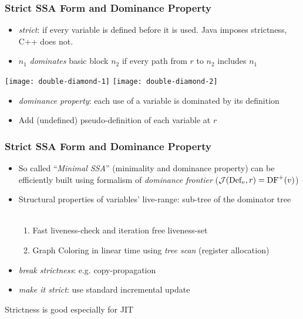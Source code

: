 \begin{frame}
\frametitle{Strict SSA Form and Dominance Property}
\begin{itemize}
\item \emph{strict}: if every variable is defined before it is used. Java imposes strictness, C++ does not.
\item $n_1$ \emph{dominates} basic block $n_2$ if every path
from $r$ to $n_2$ includes $n_1$
\end{itemize}
\begin{minipage}[t]{0.5\textwidth}
\texttt{[image: double-diamond-1]}\hfill
\texttt{[image: double-diamond-2]}
\end{minipage}
\begin{minipage}[t]{0.45\textwidth}
\begin{itemize}
\item \emph{dominance property}: each use of a variable is dominated
by its definition
\item Add (undefined) pseudo-definition of each variable at $r$
\end{itemize}
\hspace{1cm}
\end{minipage}
\end{frame}

\begin{frame}
\frametitle{Strict SSA Form and Dominance Property}
\begin{itemize}
\item So called ``\emph{Minimal SSA}'' (minimality and dominance property) can be efficiently built using formalism of \emph{dominance frontier} (${\cal J}(\textrm{Def}_v,r)=\textrm{DF}^+(v)$)
\item Structural properties of variables' live-range: sub-tree of the dominator tree ~~
\begin{enumerate}
\item Fast liveness-check and iteration free liveness-set
\item Graph Coloring in linear time using \emph{tree scan} (register allocation)
\end{enumerate}
\item \emph{break strictness}: e.g. copy-propagation
\item \emph{make it strict}: use standard incremental update
\end{itemize}
\begin{minipage}{0.5\textwidth}
\begin{alertblock}{}
Strictness is good especially for JIT
\end{alertblock}
\end{minipage}
\end{frame}

